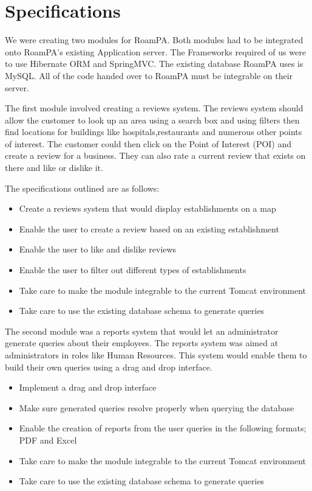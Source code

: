 \section{Specifications}

We were creating two modules for RoamPA. Both modules had to be integrated onto RoamPA's existing Application server. The Frameworks required of us were to use Hibernate ORM and SpringMVC. The existing database RoamPA uses is MySQL. All of the code handed over to RoamPA must be integrable on their server.

The first module involved creating a reviews system. The reviews system should allow the customer to look up an area using a search box and using filters then find locations for buildings like hospitals,restaurants and numerous other points of interest. The customer could then click on the Point of Interest (POI) and create a review for a business. They can also rate a current review that exists on there and like or dislike it.

The specifications outlined are as follows:

\begin{itemize}
	\item Create a reviews system that would display establishments on a map
	\item Enable the user to create a review based on an existing establishment
	\item Enable the user to like and dislike reviews
	\item Enable the user to filter out different types of establishments
	\item Take care to make the module integrable to the current Tomcat environment
	\item Take care to use the existing database schema to generate queries
\end{itemize}

The second module was a reports system that would let an administrator generate queries about their employees. The reports system was aimed at administrators in roles like Human Resources. This system would enable them to build their own queries using a drag and drop interface.

\begin{itemize}
	\item Implement a drag and drop interface 
	\item Make sure generated queries resolve properly when querying the database
	\item Enable the creation of reports from the user queries in the following formats; PDF and Excel
	\item Take care to make the module integrable to the current Tomcat environment
	\item Take care to use the existing database schema to generate queries
\end{itemize}


